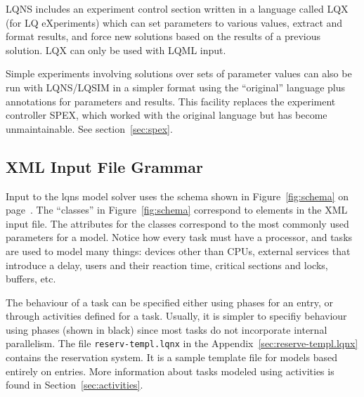 \documentclass[11pt]{article}
\begin{document}
LQNS includes an experiment control section written in a language called LQX (for LQ
eXperiments) which can set parameters to various values, extract and format results, and force new
solutions based on the results of a previous solution. LQX can only be
used with LQML input.

Simple experiments involving solutions over sets of parameter values can also be run with
LQNS/LQSIM in a simpler format using the ``original'' language plus annotations for parameters
and results. This facility replaces the experiment controller SPEX, which worked with the original
language but has become unmaintainable. See section~\ref{sec:spex}.

\subsection{XML Input File Grammar}
\label{sec:xml-grammar}

Input to the lqns model solver uses the schema shown in
Figure~\ref{fig:schema} on page~\pageref{fig:schema}.  The ``classes'' in
Figure~\ref{fig:schema} correspond to elements in the XML input file.
The attributes for the classes correspond to the most commonly used
parameters for a model.  Notice how every task must have a processor,
and tasks are used to model many things: devices other than CPUs,
external services that introduce a delay, users and their reaction
time, critical sections and locks, buffers, etc.

The behaviour of a task can be specified either using phases for an
entry, or through activities defined for a task.  Usually, it is
simpler to specifiy behaviour using phases (shown in black) since most
tasks do not incorporate internal parallelism.  The file
\texttt{reserv-templ.lqnx} in the
Appendix~\ref{sec:reserve-templ.lqnx} contains the reservation system.
It is a sample template file for models based entirely on entries.
More information about tasks modeled using activities is found in
Section~\ref{sec:activities}. 
\end{document}
